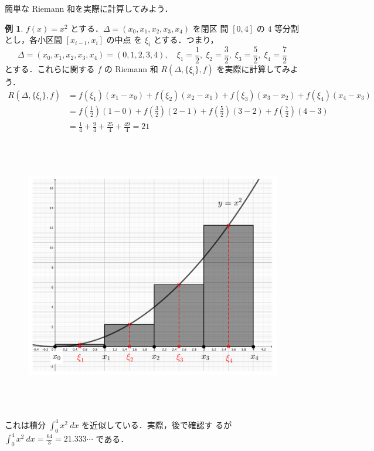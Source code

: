 \documentclass[10pt, uplatex, dvipdfmx]{jsarticle}
\theoremstyle{definition}
\newtheorem{example}[theorem]{例}
\numberwithin{equation}{section}
\newcommand{\ds}{\displaystyle}
\begin{document}
\newpage

簡単な Riemann 和を実際に計算してみよう．

\begin{example}
  $f(x)=x^2$ とする．$\Delta=(x_0,x_1,x_2,x_3,x_4)$ を閉区
  間 $[0,4]$ の $4$ 等分割とし，各小区間 $[ x_{i-1}, x_{i}]$ の中点
  を $\xi_i$ とする．つまり，
  \[
    \Delta=(x_0, x_1, x_2, x_3, x_4) =(0,1,2,3,4), \quad
    \xi_1=\frac{1}{2}, \; \xi_2=\frac{3}{2}, \; \xi_3=\frac{5}{2}, \;
    \xi_4 = \frac{7}{2}
  \]
  とする．これらに関する $f$ の Riemann 和 $R(\Delta, \{\xi_i\}, f)$ を実際に計算してみよう．
  \[
    \begin{aligned}
      R\left( \Delta, \{\xi_i\}, f\right)
      &=f(\xi_1)(x_1-x_0)+f(\xi_2)(x_2-x_1) + f(\xi_3)(x_3-x_2) +
        f(\xi_4)(x_4-x_3)\\[2ex]
      &= f\left(\frac{1}{2}\right) \left( 1-0 \right) + f\left(\frac{3}{2}\right)\left(2-1\right)
        + f\left(\frac{5}{2}\right) \left(3-2\right) + f\left(\frac{7}{2}\right)\left(4-3\right)\\[2ex]
      & = \frac{1}{4} + \frac{9}{4} + \frac{25}{4} + \frac{49}{4} = 21
    \end{aligned}
  \]
\begin{figure}[h]
  \centering
  \includegraphics[height=12cm]{./pictures/02/parabola.pdf}
\end{figure}

これは積分 $\ds \int_{0}^{4}x^2 \ dx $ を近似している．実際，後で確認す
るが $\ds \int_{0}^{4} x^2 \ dx = \frac{64}{3} = 21.333\cdots$ である．
\end{example}
\end{document}
